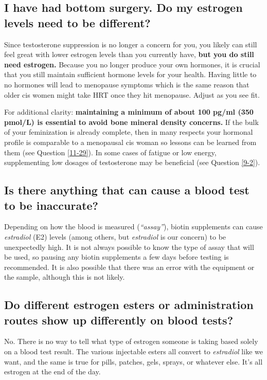 \documentclass{article}
\begin{document}
\subsection{I have had bottom surgery. Do my estrogen levels need to be different?}

Since testosterone suppression is no longer a concern for you, you likely can still feel great with lower estrogen levels than you currently have, \textbf{but you do still need estrogen.} Because you no longer produce your own hormones, it is crucial that you still maintain sufficient hormone levels for your health. Having little to no hormones will lead to menopause symptoms which is the same reason that older cis women might take HRT once they hit menopause. Adjust as you see fit.

For additional clarity: \textbf{maintaining a minimum of about 100 pg/ml (350 pmol/L) is essential to avoid bone mineral density concerns.} If the bulk of your feminization is already complete, then in many respects your hormonal profile is comparable to a menopausal cis woman so lessons can be learned from them (see Question \ref{11-29}). In some cases of fatigue or low energy, supplementing low dosages of testosterone may be beneficial (see Question \ref{9-2}).

\subsection{Is there anything that can cause a blood test to be inaccurate?}

Depending on how the blood is measured (\textit{“assay”}), biotin supplements can cause \textit{estradiol} (E2) levels (among others, but \textit{estradiol} is our concern) to be unexpectedly high. It is not always possible to know the type of assay that will be used, so pausing any biotin supplements a few days before testing is recommended. It is also possible that there was an error with the equipment or the sample, although this is not likely.

\subsection{Do different estrogen esters or administration routes show up differently on blood tests?}\label{4-16}

No. There is no way to tell what type of estrogen someone is taking based solely on a blood test result. The various injectable esters all convert to \textit{estradiol} like we want, and the same is true for pills, patches, gels, sprays, or whatever else. It's all estrogen at the end of the day.
\end{document}
